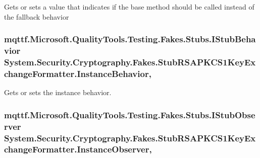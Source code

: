 Gets or sets a value that indicates if the base method should be called instead of the fallback behavior

\hypertarget{class_system_1_1_security_1_1_cryptography_1_1_fakes_1_1_stub_r_s_a_p_k_c_s1_key_exchange_formatter_ad95b55be19491f5a748d0d7d90506676}{
\subsubsection[{Instance\-Behavior}]{\setlength{\rightskip}{0pt plus 5cm}mqttf.\-Microsoft.\-Quality\-Tools.\-Testing.\-Fakes.\-Stubs.\-I\-Stub\-Behavior System.\-Security.\-Cryptography.\-Fakes.\-Stub\-R\-S\-A\-P\-K\-C\-S1\-Key\-Exchange\-Formatter.\-Instance\-Behavior\hspace{0.3cm}{\ttfamily [get]}, {\ttfamily [set]}}}\label{class_system_1_1_security_1_1_cryptography_1_1_fakes_1_1_stub_r_s_a_p_k_c_s1_key_exchange_formatter_ad95b55be19491f5a748d0d7d90506676}


Gets or sets the instance behavior.

\hypertarget{class_system_1_1_security_1_1_cryptography_1_1_fakes_1_1_stub_r_s_a_p_k_c_s1_key_exchange_formatter_ab29a8f80bba014b471134eeec544081e}{
\subsubsection[{Instance\-Observer}]{\setlength{\rightskip}{0pt plus 5cm}mqttf.\-Microsoft.\-Quality\-Tools.\-Testing.\-Fakes.\-Stubs.\-I\-Stub\-Observer System.\-Security.\-Cryptography.\-Fakes.\-Stub\-R\-S\-A\-P\-K\-C\-S1\-Key\-Exchange\-Formatter.\-Instance\-Observer\hspace{0.3cm}{\ttfamily [get]}, {\ttfamily [set]}}}\label{class_system_1_1_security_1_1_cryptography_1_1_fakes_1_1_stub_r_s_a_p_k_c_s1_key_exchange_formatter_ab29a8f80bba014b471134eeec544081e}


